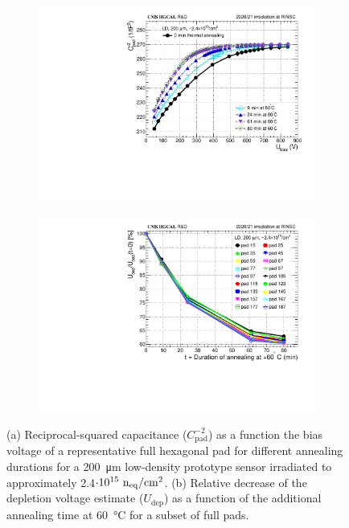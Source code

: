 \begin{figure}
	\captionsetup[subfigure]{aboveskip=-1pt,belowskip=-1pt}
	\centering

	\begin{subfigure}[b]{0.49\textwidth}
		\includegraphics[width=0.999\textwidth]{plots/annealing_Vdep/annealing_CV_ch24.pdf}
		\subcaption{
		}
        \label{plot:annealing_CV}
	\end{subfigure}
    \hfill
    \begin{subfigure}[b]{0.49\textwidth}
		\includegraphics[width=0.999\textwidth]{plots/annealing_Vdep/annealing_Vdep.pdf}
		\subcaption{
		}		
        \label{plot:annealing_Vdep}
	\end{subfigure}
	\caption{
        (a) Reciprocal-squared capacitance ($C^{-2}_\text{pad}$) as a function the bias voltage of a representative full hexagonal pad for different annealing durations for a \SI{200}{\micro\metre} low-density prototype sensor irradiated to approximately 2.4$\cdot 10^{15}~\mathrm{n_{eq}}/\mathrm{cm}^{2}$.   
		(b) Relative decrease of the depletion voltage estimate ($U_\text{dep}$) as a function of the additional annealing time at \SI{60}{\celsius} for a subset of full pads.
	}
\end{figure}
